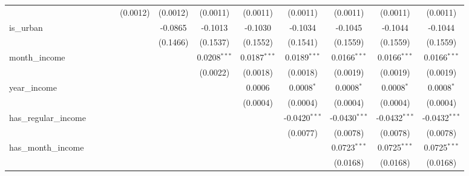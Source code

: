 \begin{table}[htbp]
\begin{tiny}
\begin{tabular}{lccccccccccc}
                                &                &                &                & (0.0012)       & (0.0012)       & (0.0011)       & (0.0011)       & (0.0011)        & (0.0011)        & (0.0011)        & (0.0011)\\
         is\_urban             &                &                &                &                & -0.0865        & -0.1013        & -0.1030        & -0.1034         & -0.1045         & -0.1044         & -0.1044\\
                                &                &                &                &                & (0.1466)       & (0.1537)       & (0.1552)       & (0.1541)        & (0.1559)        & (0.1559)        & (0.1559)\\
         month\_income         &                &                &                &                &                & 0.0208$^{***}$ & 0.0187$^{***}$ & 0.0189$^{***}$  & 0.0166$^{***}$  & 0.0166$^{***}$  & 0.0166$^{***}$\\
                                &                &                &                &                &                & (0.0022)       & (0.0018)       & (0.0018)        & (0.0019)        & (0.0019)        & (0.0019)\\
         year\_income          &                &                &                &                &                &                & 0.0006         & 0.0008$^{*}$    & 0.0008$^{*}$    & 0.0008$^{*}$    & 0.0008$^{*}$\\
                                &                &                &                &                &                &                & (0.0004)       & (0.0004)        & (0.0004)        & (0.0004)        & (0.0004)\\
         has\_regular\_income &                &                &                &                &                &                &                & -0.0420$^{***}$ & -0.0430$^{***}$ & -0.0432$^{***}$ & -0.0432$^{***}$\\
                                &                &                &                &                &                &                &                & (0.0077)        & (0.0078)        & (0.0078)        & (0.0078)\\
         has\_month\_income   &                &                &                &                &                &                &                &                 & 0.0723$^{***}$  & 0.0725$^{***}$  & 0.0725$^{***}$\\
                                &                &                &                &                &                &                &                &                 & (0.0168)        & (0.0168)        & (0.0168)\\

\end{tabular}
\end{tiny}
\end{table}
